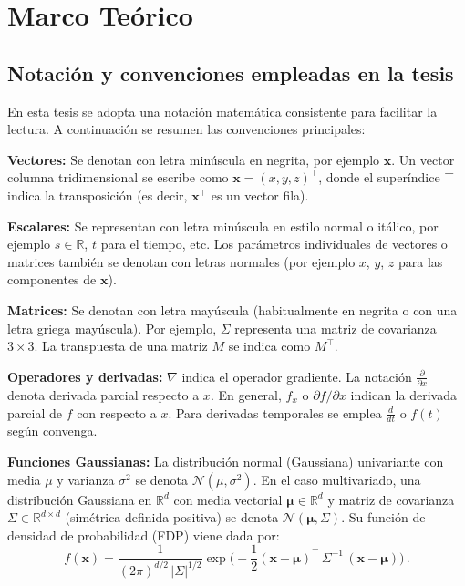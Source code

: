 \chapter{Marco Teórico}\label{chapter:theory}

\section{Notación y convenciones empleadas en la tesis}
En esta tesis se adopta una notación matemática consistente para facilitar la lectura. A continuación se resumen las convenciones principales:

\textbf{Vectores:} Se denotan con letra minúscula en negrita, por ejemplo $\mathbf{x}$. Un vector columna tridimensional se escribe como 
$\mathbf{x} = (x, y, z)^\top$, donde el superíndice $\top$ indica la transposición (es decir, $\mathbf{x}^\top$ es un vector fila).

\textbf{Escalares:} Se representan con letra minúscula en estilo normal o itálico, por ejemplo $s \in \mathbb{R}$, $t$ para el tiempo, etc. 
Los parámetros individuales de vectores o matrices también se denotan con letras normales (por ejemplo $x$, $y$, $z$ para las componentes de $\mathbf{x}$).

\textbf{Matrices:} Se denotan con letra mayúscula (habitualmente en negrita o con una letra griega mayúscula). Por ejemplo, $\Sigma$ 
representa una matriz de covarianza $3\times 3$. La transpuesta de una matriz $M$ se indica como $M^\top$.

\textbf{Operadores y derivadas:} $\nabla$ indica el operador gradiente. La notación $\frac{\partial}{\partial x}$ denota derivada parcial 
respecto a $x$. En general, $f_x$ o $\partial f/\partial x$ indican la derivada parcial de $f$ con respecto a $x$. Para derivadas temporales 
se emplea $\frac{d}{dt}$ o $\dot{f}(t)$ según convenga.

\textbf{Funciones Gaussianas:} La distribución normal (Gaussiana) univariante con media $\mu$ y varianza $\sigma^2$ se denota $\mathcal{N}(\mu,\sigma^2)$. 
En el caso multivariado, una distribución Gaussiana en $\mathbb{R}^d$ con media vectorial $\boldsymbol{\mu} \in \mathbb{R}^d$ y matriz de 
covarianza $\Sigma \in \mathbb{R}^{d\times d}$ (simétrica definida positiva) se denota $\mathcal{N}(\boldsymbol{\mu}, \Sigma)$. 
Su función de densidad de probabilidad (FDP) viene dada por:
$$f(\mathbf{x}) = \frac{1}{(2\pi)^{d/2}\,|\Sigma|^{1/2}} \exp\!\Big(-\frac{1}{2}(\mathbf{x}-\boldsymbol{\mu})^\top \,\Sigma^{-1}\,(\mathbf{x}-\boldsymbol{\mu})\Big)\,.$$

